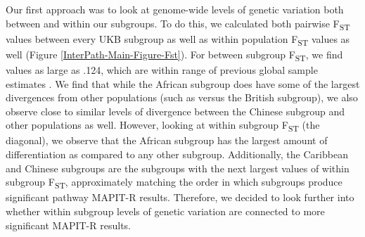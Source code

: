 \documentclass[12pt,a4paper]{article}
\begin{document}
Our first approach was to look at genome-wide levels of genetic variation both between and within our subgroups. To do this, we calculated both pairwise F\textsubscript{ST} values between every UKB subgroup as well as within population F\textsubscript{ST} values as well (Figure \ref{InterPath-Main-Figure-Fst}). For between subgroup F\textsubscript{ST}, we find values as large as .124, which are within range of previous global sample estimates \citep{Ramachandran2005,Weir2005,Wang2012,Sugden2016}. We find that while the African subgroup does have some of the largest divergences from other populations (such as versus the British subgroup), we also observe close to similar levels of divergence between the Chinese subgroup and other populations as well. However, looking at within subgroup F\textsubscript{ST} (the diagonal), we observe that the African subgroup has the largest amount of differentiation as compared to any other subgroup. Additionally, the Caribbean and Chinese subgroups are the subgroups with the next largest values of within subgroup F\textsubscript{ST}, approximately matching the order in which subgroups produce significant pathway MAPIT-R results. Therefore, we decided to look further into whether within subgroup levels of genetic variation are connected to more significant MAPIT-R results.
\end{document}
